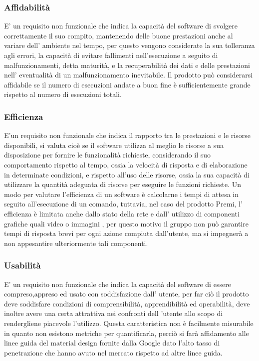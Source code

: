 \subsubsection{Affidabilità}

E' un requisito non funzionale che indica la capacità del software di svolgere correttamente il suo compito, mantenendo delle buone prestazioni anche al variare dell' ambiente nel tempo, per questo vengono considerate la sua tolleranza agli errori, la capacità di evitare fallimenti nell’esecuzione a seguito di malfunzionamenti,
detta maturità, e la recuperabilità dei dati e delle prestazioni nell' eventualità di un malfunzionamento inevitabile. Il prodotto può considerarsi affidabile se il numero di esecuzioni andate a buon fine è sufficientemente grande rispetto al numero di esecuzioni totali.

\subsubsection{Efficienza}

E'un requisito non funzionale che indica il rapporto tra le prestazioni e le risorse disponibili, si valuta cioè se il software utilizza al meglio le risorse a sua disposizione per fornire le funzionalità richieste, considerando il suo comportamento rispetto al tempo, ossia la velocità di risposta e di elaborazione in determinate condizioni, e rispetto all’uso delle risorse, ossia la sua capacità di utilizzare la quantità adeguata di risorse per eseguire le funzioni richieste. Un modo per valutare l’efficienza di un software è calcolarne i tempi di attesa in seguito all’esecuzione di un comando, tuttavia, nel caso del prodotto Premi, l' efficienza è limitata anche dallo stato della rete e dall' utilizzo di componenti grafiche quali video o immagini , per questo motivo il gruppo non può garantire tempi di risposta brevi per ogni azione compiuta dall’utente, ma si impegnerà a non appesantire ulteriormente tali componenti.

\subsubsection{Usabilità}

E' un requisito non funzionale che indica la capacità del software di essere compreso,appreso ed usato con soddisfazione dall' utente, per far ciò il prodotto deve soddisfare condizioni di comprensibilità, apprendibilità ed operabilità, deve inoltre avere una certa attrattiva nei confronti dell 'utente allo scopo di rendergliene piacevole l’utilizzo. Questa caratteristica non è facilmente misurabile in quanto non esistono metriche per quantificarla, perciò si farà affidamento alle linee guida del material design fornite dalla Google dato l'alto tasso di penetrazione che hanno avuto nel mercato rispetto ad altre linee guida.

